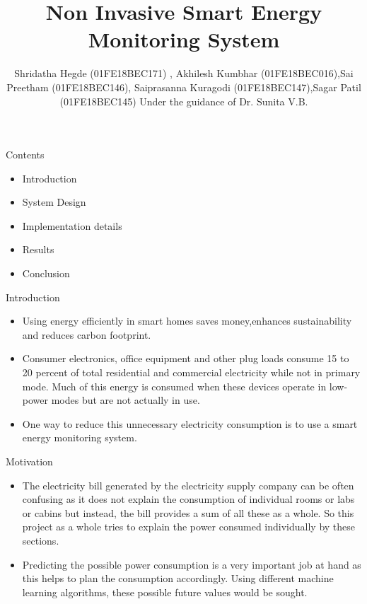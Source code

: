 \documentclass[11pt, aspect ratio=169]{beamer}
\author[]{Shridatha Hegde (01FE18BEC171) , Akhilesh Kumbhar (01FE18BEC016),\newline  Sai Preetham (01FE18BEC146), Saiprasanna Kuragodi (01FE18BEC147),\newline Sagar Patil (01FE18BEC145) \vspace{5pt} \newline Under the guidance of \newline Dr. Sunita V.B.}
\title{Non Invasive Smart Energy Monitoring System}
\institute{KLE Technological University,Vidyanagar, Hubballi-580031,Karnataka, India}
\date{\displaydate{date}}
\begin{document}
\begin{frame}
\titlepage
\end{frame}

\begin{frame}{Contents}
\begin{itemize}
\item Introduction
\item System Design 
\item Implementation details
\item Results
\item Conclusion
\end{itemize}
\end{frame}

\begin{frame}{Introduction}
\begin{center}
\begin{large}
\begin{itemize}

\item Using energy efficiently in smart homes saves money,enhances sustainability and reduces carbon footprint.
\item Consumer electronics, office equipment and other plug loads consume 15 to 20 percent of total residential and commercial electricity while not in primary mode. Much of this energy is consumed when these devices operate in low-power modes but are not actually in use.
\item One way to reduce this unnecessary electricity consumption is to use a smart energy monitoring system.

\end{itemize}
\end{large}
\end{center}
\end{frame}


\begin{frame}{Motivation}
\begin{itemize}
	\item The electricity bill generated by the electricity supply company can be often confusing as it does
not explain the consumption of individual rooms or labs or cabins but instead, the bill provides a sum of all these as a whole. So this project as a whole tries to explain the power consumed individually by these sections. 
	\item Predicting the possible power consumption is a very important job at hand as this helps to plan the consumption accordingly. Using different machine learning algorithms, these possible future values would be sought.
\end{itemize}
\end{frame}
\end{document}
